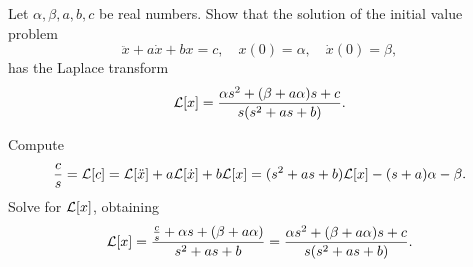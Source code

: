 \documentclass{ximera}
\begin{document}
\begin{exercise} \label{c13.4.4}
Let $\alpha,\beta,a,b,c$ be real numbers.  Show that the solution
of the initial value problem
\[
\ddot x +a\dot x +b x=c,\quad x(0)=\alpha,\quad \dot x(0)=\beta,
\]
has the Laplace transform
\[
{\cal L}[x] = \frac{\alpha s^2 +(\beta +a\alpha)s+c}{s(s^2+as+b)}.
\]

\begin{solution}
Compute
\[
\frac{c}{s} = {\cal L}[c]
= {\cal L}[\ddot{x}] + a{\cal L}[\dot{x}] + b{\cal L}[x]
= (s^2 + as + b){\cal L}[x] - (s + a)\alpha - \beta.
\]
Solve for ${\cal L}[x]$, obtaining
\[
{\cal L}[x]
= \frac{\frac{c}{s} + \alpha s + (\beta + a\alpha)}{s^2 + as + b}
= \frac{\alpha s^2 + (\beta + a\alpha)s + c}{s(s^2 + as + b)}.
\]


\end{solution}
\end{exercise}
\end{document}
